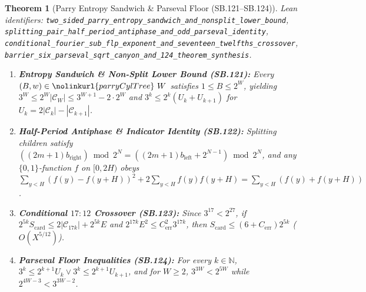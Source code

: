 \documentclass[11pt]{article}
\newtheorem{theorem}{Theorem}[section]
\begin{document}
\begin{theorem}[Parry Entropy Sandwich \& Parseval Floor (SB.121--SB.124)]
\emph{Lean identifiers:} \nolinkurl{two_sided_parry_entropy_sandwich_and_nonsplit_lower_bound}, \nolinkurl{splitting_pair_half_period_antiphase_and_odd_parseval_identity}, \nolinkurl{conditional_fourier_sub_flp_exponent_and_seventeen_twelfths_crossover}, \nolinkurl{barrier_six_parseval_sqrt_canyon_and_124_theorem_synthesis}.
\begin{enumerate}
  \item \textbf{Entropy Sandwich \& Non-Split Lower Bound (SB.121):} Every $(B, w) \in \nolinkurl{parryCylTree}\ W$ satisfies $1 \le B \le 2^W$, yielding $3^W \le 2^W |\mathcal{C}_W| \le 3^{W+1} - 2 \cdot 2^W$ and $3^k \le 2^k(U_k + U_{k+1})$ for $U_k = 2|\mathcal{C}_k| - |\mathcal{C}_{k+1}|$.
  \item \textbf{Half-Period Antiphase \& Indicator Identity (SB.122):} Splitting children satisfy $((2m+1) b_{\text{right}}) \bmod 2^N = ((2m+1) b_{\text{left}} + 2^{N-1}) \bmod 2^N$, and any $\{0,1\}$-function $f$ on $[0, 2H)$ obeys $\sum_{y < H} (f(y) - f(y+H))^2 + 2 \sum_{y < H} f(y) f(y+H) = \sum_{y < H} (f(y) + f(y+H))$.
  \item \textbf{Conditional $17:12$ Crossover (SB.123):} Since $3^{17} < 2^{27}$, if $2^{5k} S_{\text{card}} \le 2 |\mathcal{C}_{17k}| + 2^{5k} E$ and $2^{17k} E^2 \le C_{\text{err}}^2 3^{17k}$, then $S_{\text{card}} \le (6 + C_{\text{err}}) 2^{5k}$ ($O(X^{5/12})$).
  \item \textbf{Parseval Floor Inequalities (SB.124):} For every $k \in \mathbb{N}$, $3^k \le 2^{k+1} U_k \vee 3^k \le 2^{k+1} U_{k+1}$, and for $W \ge 2$, $3^{3W} < 2^{5W}$ while $2^{4W-3} < 3^{3W-2}$.
\end{enumerate}
\end{theorem}
\end{document}
